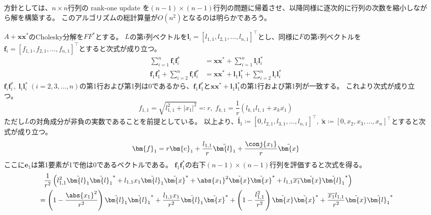         \begin{derivation*}
            方針としては、$n\times n$行列の rank-one update を$(n-1)\times(n-1)$行列の問題に帰着させ、以降同様に逐次的に行列の次数を縮小しながら解を構築する。
            このアルゴリズムの総計算量が$O(n^2)$となるのは明らかであろう。
            \par
            $A+\bm{x}\bm{x}^*$のCholesky分解を$FF^*$とする。
            $L$の第$i$列ベクトルを$\bm{l}_i = [l_{1,1},l_{2,1},\dots,l_{n,1}]^\top$とし、同様に$F$の第$i$列ベクトルを$\bm{f}_i = [f_{1,1},f_{2,1},\dots,f_{n,1}]^\top$とすると次式が成り立つ。
            \begin{align*}
                \sum_{i=1}^n \bm{f}_i\bm{f}_i^* &= \bm{x}\bm{x}^* + \sum_{i=1}^n \bm{l}_i\bm{l}_i^* \\
                \bm{f}_1\bm{f}_1^* + \sum_{i=2}^n \bm{f}_i\bm{f}_i^* &= \bm{x}\bm{x}^* + \bm{l}_1\bm{l}_1^* + \sum_{i=2}^n \bm{l}_i\bm{l}_i^* \tag{1}
            \end{align*}
            $\bm{f}_i\bm{f}_i^*,\;\bm{l}_i\bm{l}_i^*\;(i=2,3,\dots,n)$の第1行および第1列は0であるから、$\bm{f}_1\bm{f}_1^*$と$\bm{x}\bm{x}^* + \bm{l}_1\bm{l}_1^*$の第1行および第1列が一致する。
            これより次式が成り立つ。
            \[ f_{1,1} = \sqrt{l_{1,1}^2 + |x_1|^2} \eqqcolon r,\; f_{k,1} = \frac{1}{r}\left(l_{k,1}l_{1,1} + x_k\overline{x_1}\right) \tag{2} \]
            ただし$L$の対角成分が非負の実数であることを前提としている。
            以上より、$\tilde{\bm{l}_1} \coloneqq [0,l_{2,1},l_{3,1},\dots,l_{n,1}]^\top,\;\tilde{\bm{x}} \coloneqq [0,x_2,x_3,\dots,x_n]^\top$とすると次式が成り立つ。
            \[ \bm{f}_1 = r\bm{e}_1 + \frac{l_{1,1}}{r}\tilde{\bm{l}_1} + \frac{\conj{x_1}}{r}\tilde{\bm{x}} \]
            ここに$\bm{e}_1$は第1要素が1で他は0であるベクトルである。
            $\bm{f}_1\bm{f}_1^*$の右下$(n-1)\times(n-1)$行列を評価すると次式を得る。
            \begin{align*}
                &\phantom{=} \frac{1}{r^2} \left(l_{1,1}^2\tilde{\bm{l}_1}\tilde{\bm{l}_1}^* + l_{1,1}x_1\tilde{\bm{l}_1}\tilde{\bm{x}}^* + \abs{x_1}^2\tilde{\bm{x}}\tilde{\bm{x}}^* + l_{1,1}\overline{x_1}\tilde{\bm{x}}\tilde{\bm{l}_1}^*\right) \\
                &= \left(1 - \frac{\abs{x_1}^2}{r^2}\right)\tilde{\bm{l}_1}\tilde{\bm{l}_1}^* + \frac{l_{1,1}x_1}{r^2}\tilde{\bm{l}_1}\tilde{\bm{x}}^* + \left(1 - \frac{l_{1,1}^2}{r^2}\right)\tilde{\bm{x}}\tilde{\bm{x}}^* + \frac{\overline{x_1}l_{1,1}}{r^2}\tilde{\bm{x}}\tilde{\bm{l}_1}^* \\

\end{align*}
\end{derivation*}
